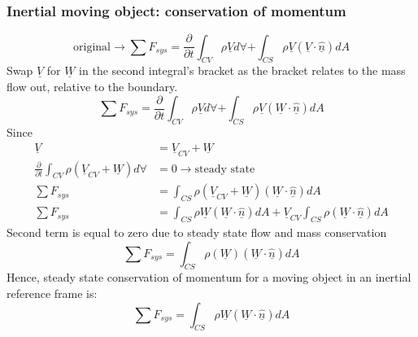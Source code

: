 \documentclass[class=report, crop=false, 12pt,a4paper]{standalone}
\begin{document}
\subsubsection{Inertial moving object: conservation of momentum}
\begin{equation}
  \textrm{original} \rightarrow \sum F_{sys} = \frac{\partial}{\partial t} \int_{CV} \rho \underline{V} d \forall + \int_{CS} \rho \underline{V} (\underline{V}\cdot \underline{\hat{n}}) dA 
\end{equation}
Swap $\underline{V}$ for $\underline{W}$ in the second integral's bracket as the bracket relates to the mass flow out, relative to the boundary. 
\begin{equation}
  \sum F_{sys} = \frac{\partial}{\partial t} \int_{CV} \rho \underline{V} d \forall + \int_{CS} \rho \underline{V} (\underline{W}\cdot \underline{\hat{n}}) dA 
\end{equation}
Since
\begin{align}
  \underline{V} &= \underline{V}_{CV} + \underline{W}\\
  \frac{\partial}{\partial t} \int_{CV} \rho (\underline{V}_{CV} + \underline{W}) d \forall &= 0 \rightarrow \textrm{steady state}\\
  \sum F_{sys} &= \int_{CS} \rho (\underline{V}_{CV} + \underline{W}) (\underline{W}\cdot \underline{\hat{n}}) dA \\
  \sum F_{sys} &= \int_{CS} \rho \underline{W}(\underline{W}\cdot \underline{\hat{n}}) dA + \underline{V}_{CV} \int_{CS} \rho (\underline{W}\cdot \underline{\hat{n}}) dA
\end{align}
Second term is equal to zero due to steady state flow and mass conservation
\begin{equation}
  \sum F_{sys} = \int_{CS} \rho (\underline{W})(\underline{W}\cdot \underline{\hat{n}}) dA 
\end{equation}
Hence, steady state conservation of momentum for a moving object in an inertial reference frame is: 
\begin{equation}
  \sum F_{sys} = \int_{CS} \rho \underline{W} (\underline{W}\cdot \underline{\hat{n}}) dA
\end{equation}
\end{document}
